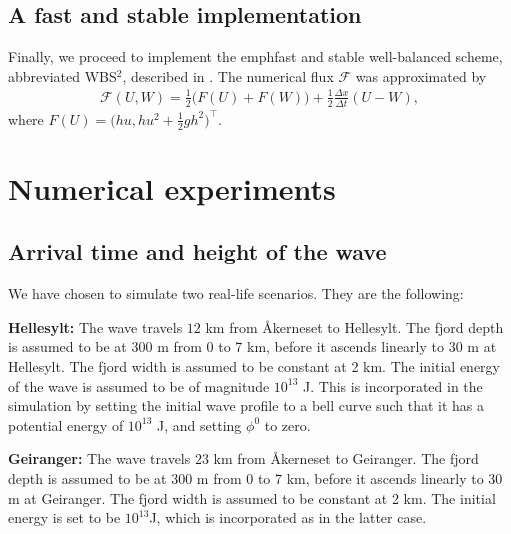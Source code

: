 \documentclass[11pt]{article}
\begin{document}
\subsection{A fast and stable implementation}
Finally, we proceed to implement the emph{fast and stable well-balanced scheme}, abbreviated WBS$^2$, described in \cite{audusse04}. The numerical flux $\mathcal{F}$ was approximated by
\begin{align*}
    \mathcal{F}(U, W) = \frac{1}{2}\big(F(U) + F(W)\big) + \frac{1}{2} \frac{\Delta x}{\Delta t} (U - W),
\end{align*}
where $F(U) = \big(hu, hu^2 + \frac{1}{2}gh^2\big)^\top$.
%
%
\section{Numerical experiments}
\subsection{Arrival time and height of the wave}
We have chosen to simulate two real-life scenarios. They are the following:

\textbf{Hellesylt:} The wave travels $12$ km from Åkerneset to Hellesylt. The fjord depth is assumed to be at 300 m from 0 to 7 km, before it ascends linearly
to 30 m at Hellesylt. The fjord width is assumed to be constant at 2 km. The initial energy of the wave is assumed to be of magnitude $10^{13}$ J. This is incorporated in the simulation by
setting the initial wave profile to a bell curve such that it has a potential energy of $10^{13}$ J, and setting $\phi^0$ to zero.

\textbf{Geiranger:} The wave travels $23$ km from Åkerneset to Geiranger. The fjord depth is assumed to be at 300 m from 0 to 7 km, before it ascends linearly
to 30 m at Geiranger. The fjord width is assumed to be constant at 2 km. The initial energy is set to be $10^{13}$J, which is incorporated as in the latter case.
\end{document}

